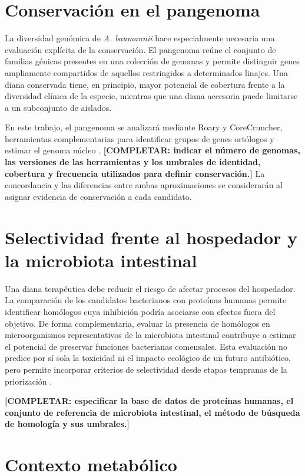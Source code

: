 \section{Conservación en el pangenoma}

La diversidad genómica de \textit{A. baumannii} hace especialmente necesaria una evaluación explícita de la conservación. El pangenoma reúne el conjunto de familias génicas presentes en una colección de genomas y permite distinguir genes ampliamente compartidos de aquellos restringidos a determinados linajes. Una diana conservada tiene, en principio, mayor potencial de cobertura frente a la diversidad clínica de la especie, mientras que una diana accesoria puede limitarse a un subconjunto de aislados.

En este trabajo, el pangenoma se analizará mediante Roary y CoreCruncher, herramientas complementarias para identificar grupos de genes ortólogos y estimar el genoma núcleo \cite{Page2015,CoreCruncher2021}. \textbf{[COMPLETAR: indicar el número de genomas, las versiones de las herramientas y los umbrales de identidad, cobertura y frecuencia utilizados para definir conservación.]} La concordancia y las diferencias entre ambas aproximaciones se considerarán al asignar evidencia de conservación a cada candidato.

\section{Selectividad frente al hospedador y la microbiota intestinal}

Una diana terapéutica debe reducir el riesgo de afectar procesos del hospedador. La comparación de los candidatos bacterianos con proteínas humanas permite identificar homólogos cuya inhibición podría asociarse con efectos fuera del objetivo. De forma complementaria, evaluar la presencia de homólogos en microorganismos representativos de la microbiota intestinal contribuye a estimar el potencial de preservar funciones bacterianas comensales. Esta evaluación no predice por sí sola la toxicidad ni el impacto ecológico de un futuro antibiótico, pero permite incorporar criterios de selectividad desde etapas tempranas de la priorización \cite{Kaur2021,Rai2025}.

\textbf{[COMPLETAR: especificar la base de datos de proteínas humanas, el conjunto de referencia de microbiota intestinal, el método de búsqueda de homología y sus umbrales.]}

\section{Contexto metabólico}

